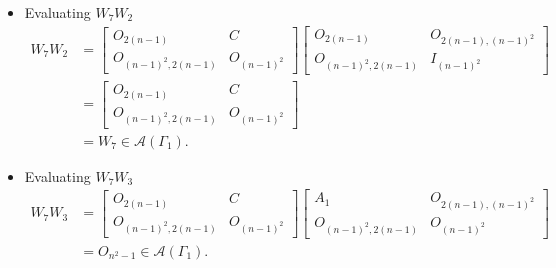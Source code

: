 \begin{itemize}
    \item Evaluating $W_7W_2$
    \begin{align*}
        W_7W_2
        &= \begin{bmatrix}
            O_{2(n-1)} & C \\
            O_{(n-1)^2, 2(n-1)} & O_{(n-1)^2}
        \end{bmatrix}\begin{bmatrix}
            O_{2(n-1)} & O_{2(n-1), (n-1)^2} \\
            O_{(n-1)^2, 2(n-1)} & I_{(n-1)^2}
        \end{bmatrix}\\
        &= \begin{bmatrix}
            O_{2(n-1)} & C \\
            O_{(n-1)^2, 2(n-1)} & O_{(n-1)^2}
        \end{bmatrix}\\
        &= W_7\in\mathcal{A}(\Gamma_1).
    \end{align*}
    
    \item Evaluating $W_7W_3$
    \begin{align*}
        W_7W_3
        &= \begin{bmatrix}
            O_{2(n-1)} & C \\
            O_{(n-1)^2, 2(n-1)} & O_{(n-1)^2}
        \end{bmatrix}\begin{bmatrix}
            A_1 & O_{2(n-1), (n-1)^2} \\
            O_{(n-1)^2, 2(n-1)} & O_{(n-1)^2}
        \end{bmatrix}\\
        &= O_{n^2-1}\in\mathcal{A}(\Gamma_1).
    \end{align*}
    

\end{itemize}
